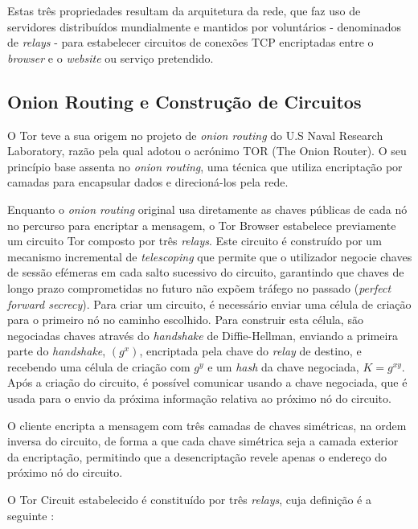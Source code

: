 Estas três propriedades resultam da arquitetura da rede, que faz uso de servidores distribuídos mundialmente e mantidos por voluntários - denominados de \textit{relays} - para estabelecer circuitos de conexões TCP encriptadas entre o \textit{browser} e o \textit{website} ou serviço pretendido.

\subsection{Onion Routing e Construção de Circuitos}
\label{sub:onion_routing_circuitos}

O Tor teve a sua origem no projeto de \textit{onion routing} do U.S Naval Research Laboratory, razão pela qual adotou o acrónimo TOR (The Onion Router). O seu princípio base assenta no \textit{onion routing}, uma técnica que utiliza encriptação por camadas para encapsular dados e direcioná-los pela rede.

Enquanto o \textit{onion routing} original usa diretamente as chaves públicas de cada nó no percurso para encriptar a mensagem, o Tor Browser estabelece previamente um circuito Tor composto por três \textit{relays}. Este circuito é construído por um mecanismo incremental de \textit{telescoping} que permite que o utilizador negocie chaves de sessão efémeras em cada salto sucessivo do circuito, garantindo que chaves de longo prazo comprometidas no futuro não expõem tráfego no passado (\textit{perfect forward secrecy}). Para criar um circuito, é necessário enviar uma célula de criação para o primeiro nó no caminho escolhido. Para construir esta célula, são negociadas chaves através do \textit{handshake} de Diffie-Hellman, enviando a primeira parte do \textit{handshake}, $(g^x)$, encriptada pela chave do \textit{relay} de destino, e recebendo uma célula de criação com $g^y$ e um \textit{hash} da chave negociada, $K=g^{xy}$. Após a criação do circuito, é possível comunicar usando a chave negociada, que é usada para o envio da próxima informação relativa ao próximo nó do circuito.

O cliente encripta a mensagem com três camadas de chaves simétricas, na ordem inversa do circuito, de forma a que cada chave simétrica seja a camada exterior da encriptação, permitindo que a desencriptação revele apenas o endereço do próximo nó do circuito.

O Tor Circuit estabelecido é constituído por três \textit{relays}, cuja definição é a seguinte \cite{dingledine2004tor}:

